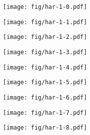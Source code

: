 \documentclass{beamer}
\begin{document}
\begin{frame}
\begin{columns}[t]
\begin{column}{5cm}
  {
    \begin{figure}[h!]
      \centering
      \texttt{[image: fig/har-1-0.pdf]}
    \end{figure}
  }
  {
    \begin{figure}[h!]
      \centering
      \texttt{[image: fig/har-1-1.pdf]}
    \end{figure}
  }
  {
    \begin{figure}[h!]
      \centering
      \texttt{[image: fig/har-1-2.pdf]}
    \end{figure}
  }
  {
    \begin{figure}[h!]
      \centering
      \texttt{[image: fig/har-1-3.pdf]}
    \end{figure}
  }
  {
    \begin{figure}[h!]
      \centering
      \texttt{[image: fig/har-1-4.pdf]}
    \end{figure}
  }
  {
    \begin{figure}[h!]
      \centering
      \texttt{[image: fig/har-1-5.pdf]}
    \end{figure}
  }
  {
    \begin{figure}[h!]
      \centering
      \texttt{[image: fig/har-1-6.pdf]}
    \end{figure}
  }
  {
    \begin{figure}[h!]
      \centering
      \texttt{[image: fig/har-1-7.pdf]}
    \end{figure}
  }
  {
    \begin{figure}[h!]
      \centering
      \texttt{[image: fig/har-1-8.pdf]}
    \end{figure}
  }   
  \end{column}
\end{columns} 
\end{frame}
\end{document}
